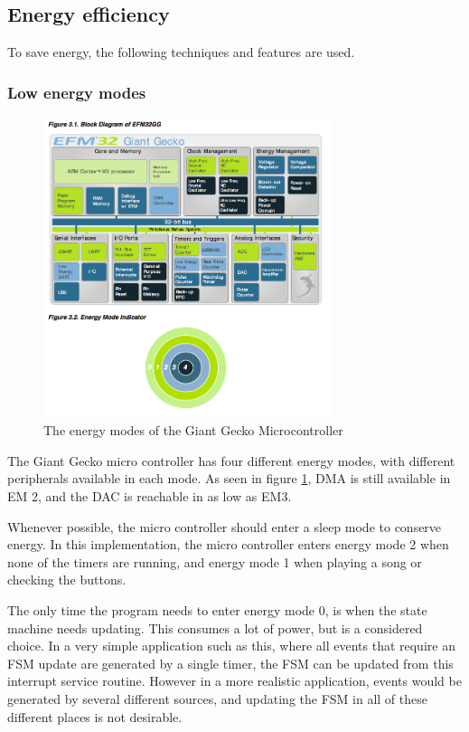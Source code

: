 \subsection{Energy efficiency}

To save energy, the following techniques and features are used.

\subsubsection{Low energy modes}

\begin{figure}[H]
\centering
\includegraphics[width=0.75\textwidth]{figures/energymodes.png}
\caption{The energy modes of the Giant Gecko Microcontroller}
\label{fig:energymodes}
\end{figure}

The Giant Gecko micro controller has four different energy modes, with different peripherals available in each mode. As seen in figure \ref{fig:energymodes}, DMA is still available in EM 2, and the DAC is reachable in as low as EM3.

Whenever possible, the micro controller should enter a sleep mode to conserve energy.
In this implementation, the micro controller enters energy mode 2 when none of the timers are running, and energy mode 1 when playing a song or checking the buttons.

The only time the program needs to enter energy mode 0, is when the state machine needs updating.
This consumes a lot of power, but is a considered choice.
In a very simple application such as this, where all events that require an FSM update are generated by a single timer, the FSM can be updated from this interrupt service routine.
However in a more realistic application, events would be generated by several different sources, and updating the FSM in all of these different places is not desirable.

